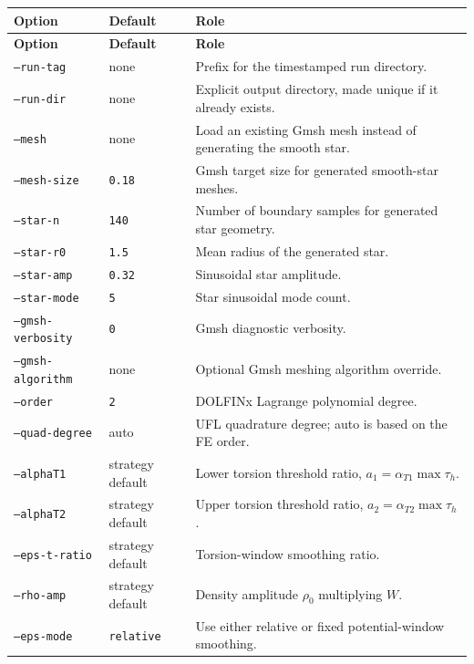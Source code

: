 \documentclass[11pt]{article}
\begin{document}
\begingroup
\scriptsize
\setlength{\LTleft}{0pt}
\setlength{\LTright}{0pt}
\renewcommand{\arraystretch}{1.08}
\begin{longtable}{>{\raggedright\arraybackslash}p{}
                  >{\raggedright\arraybackslash}p{}
                  >{\raggedright\arraybackslash}p{}}
\toprule
\textbf{Option} & \textbf{Default} & \textbf{Role} \\
\midrule
\endfirsthead
\toprule
\textbf{Option} & \textbf{Default} & \textbf{Role} \\
\midrule
\endhead
\bottomrule
\endfoot
\texttt{--run-tag} & none & Prefix for the timestamped run directory. \\
\texttt{--run-dir} & none & Explicit output directory, made unique if it already exists. \\
\texttt{--mesh} & none & Load an existing Gmsh mesh instead of generating the smooth star. \\
\texttt{--mesh-size} & \texttt{0.18} & Gmsh target size for generated smooth-star meshes. \\
\texttt{--star-n} & \texttt{140} & Number of boundary samples for generated star geometry. \\
\texttt{--star-r0} & \texttt{1.5} & Mean radius of the generated star. \\
\texttt{--star-amp} & \texttt{0.32} & Sinusoidal star amplitude. \\
\texttt{--star-mode} & \texttt{5} & Star sinusoidal mode count. \\
\texttt{--gmsh-verbosity} & \texttt{0} & Gmsh diagnostic verbosity. \\
\texttt{--gmsh-algorithm} & none & Optional Gmsh meshing algorithm override. \\
\texttt{--order} & \texttt{2} & DOLFINx Lagrange polynomial degree. \\
\texttt{--quad-degree} & auto & UFL quadrature degree; auto is based on the FE order. \\
\texttt{--alphaT1} & strategy default & Lower torsion threshold ratio, $a_1=\alpha_{T1}\max\tau_h$. \\
\texttt{--alphaT2} & strategy default & Upper torsion threshold ratio, $a_2=\alpha_{T2}\max\tau_h$. \\
\texttt{--eps-t-ratio} & strategy default & Torsion-window smoothing ratio. \\
\texttt{--rho-amp} & strategy default & Density amplitude $\rho_0$ multiplying $W$. \\
\texttt{--eps-mode} & \texttt{relative} & Use either relative or fixed potential-window smoothing. \\

\end{longtable}
\end{document}
